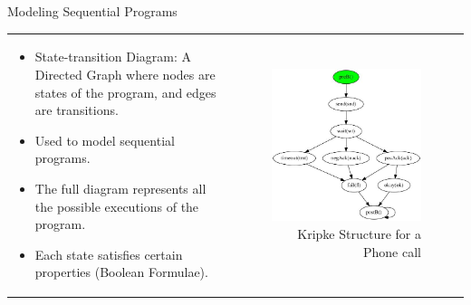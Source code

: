 \documentclass{bredelebeamer}
\begin{document}
\begin{frame}{Modeling Sequential Programs} %
\begin{tabular}{l r}
\begin{minipage}{0.5\textwidth}
\vspace{-5mm}
\hspace{-5mm}
\noindent {\large Kripke Structure:}
\begin{itemize}
\item State-transition Diagram: A Directed Graph where nodes are states of the program, and edges are transitions.
\item Used to model sequential programs.
\item The full diagram represents all the possible executions of the program.
\item Each state satisfies certain properties (Boolean Formulae).
\end{itemize} 
\end{minipage}
&
\begin{minipage}{0.5\textwidth}
\begin{figure}
\centering
\includegraphics[scale=0.2]{kripke.jpg}
\caption{Kripke Structure for a Phone call}
\end{figure}
\end{minipage}
\end{tabular}
\end{frame}
\end{document}
